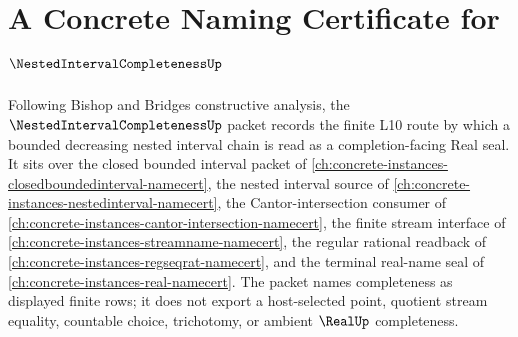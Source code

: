 \chapter{A Concrete Naming Certificate for $\NestedIntervalCompletenessUp$}
\label{ch:concrete-instances-nested-interval-completeness-namecert}

Following Bishop and Bridges constructive analysis, the $\NestedIntervalCompletenessUp$ packet records the finite L10 route by which a bounded decreasing nested interval chain is read as a completion-facing Real seal. It sits over the closed bounded interval packet of \autoref{ch:concrete-instances-closedboundedinterval-namecert}, the nested interval source of \autoref{ch:concrete-instances-nestedinterval-namecert}, the Cantor-intersection consumer of \autoref{ch:concrete-instances-cantor-intersection-namecert}, the finite stream interface of \autoref{ch:concrete-instances-streamname-namecert}, the regular rational readback of \autoref{ch:concrete-instances-regseqrat-namecert}, and the terminal real-name seal of \autoref{ch:concrete-instances-real-namecert}. The packet names completeness as displayed finite rows; it does not export a host-selected point, quotient stream equality, countable choice, trichotomy, or ambient $\RealUp$ completeness.

